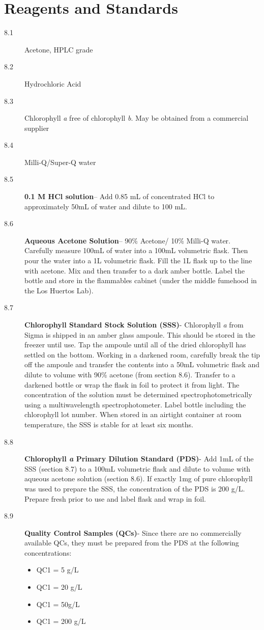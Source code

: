 \documentclass[12pt]{../SOP2}
\begin{document}
\section{Reagents and Standards}
\begin{description}
\item[8.1] Acetone, HPLC grade
\item[8.2] Hydrochloric Acid
\item[8.3] Chlorophyll \textit{a} free of chlorophyll \textit{b}. May be obtained from a commercial supplier
\item[8.4] Milli-Q/Super-Q water
\item[8.5] \textbf{0.1 M HCl solution}-- Add 0.85 mL of concentrated HCl to approximately 50mL of water and dilute to 100 mL. 
\item[8.6] \textbf{Aqueous Acetone Solution}-- 90\% Acetone/ 10\% Milli-Q water. Carefully measure 100mL of water into a 100mL volumetric flask. Then pour the water into a 1L volumetric flask. Fill the 1L flask up to the line with acetone. Mix and then transfer to a dark amber bottle. Label the bottle and store in the flammables cabinet (under the middle fumehood in the Los Huertos Lab). 
\item[8.7] \textbf{Chlorophyll Standard Stock Solution (SSS)}- Chlorophyll \textit{a} from Sigma is shipped in an amber glass ampoule. This should be stored in the freezer until use. Tap the ampoule until all of the dried chlorophyll has settled on the bottom. Working in a darkened room, carefully break the tip off the ampoule and transfer the contents into a 50mL volumetric flask and dilute to volume with 90\% acetone (from section 8.6). Transfer to a darkened bottle or wrap the flask in foil to protect it from light. The concentration of the solution must be determined spectrophotometrically using a multiwavelength spectrophotometer. Label bottle including the chlorophyll lot number. When stored in an airtight container at room temperature, the SSS is stable for at least six months. 
\item[8.8] \textbf{Chlorophyll \textit{a} Primary Dilution Standard (PDS)}- Add 1mL of the SSS (section 8.7) to a 100mL volumetric flask and dilute to volume with aqueous acetone solution (section 8.6). If exactly 1mg of pure chlorophyll was used to prepare the SSS, the concentration of the PDS is 200 \micro g/L. Prepare fresh prior to use and label flask and wrap in foil. 
\item[8.9] \textbf{Quality Control Samples (QCs)}- Since there are no commercially available QCs, they must be prepared from the PDS at the following concentrations:
\begin{itemize}
\item QC1 = 5 \micro g/L
\item QC1 = 20 \micro g/L
\item QC1 = 50\micro g/L
\item QC1 = 200 \micro g/L
\end{itemize}
\end{description}
\end{document}
